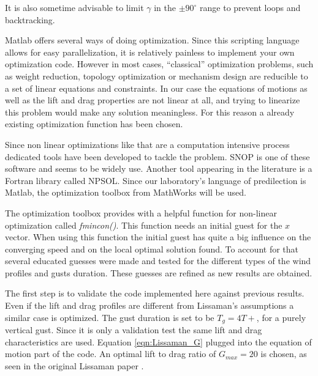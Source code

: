 \par It is also sometime advisable to limit $\gamma$ in the $\pm 90^{\circ}$ range to prevent loops and backtracking.


Matlab offers several ways of doing optimization.
Since this scripting language allows for easy parallelization, it is relatively painless to implement your own optimization code.
However in most cases, ``classical'' optimization problems, such as weight reduction, topology optimization or mechanism design are reducible to a set of linear  equations and constraints.
In our case the equations of motions as well as the lift and drag properties are not linear at all, and trying to linearize this problem would make any solution meaningless.
For this reason a already existing optimization function has been chosen.

\par Since non linear optimizations like that are a computation intensive process dedicated tools have been developed to tackle the problem.
SNOP is one of these software and seems to be widely use.
Another tool appearing in the literature is a Fortran library called NPSOL.
Since our laboratory's language of predilection is Matlab, the optimization toolbox from MathWorks will be used.

\par The optimization toolbox provides with a helpful function for non-linear optimization called \emph{fmincon()}.
This function needs an initial guest for the $x$ vector.
When using this function the initial guest has quite a big influence on the converging speed and on the local optimal solution found.
To account for that several educated guesses were made and tested for the different types of the wind profiles and gusts duration.
These guesses are refined as new results are obtained.


 \label{sec:results}

The first step is to validate the code implemented here against previous results. 
Even if the lift and drag profiles are different from Lissaman's assumptions a similar case is optimized.
The gust duration is set to be $T_g=4 T+$, for a purely vertical gust.
Since it is only a validation test the same lift and drag characteristics are used. Equation \ref{eqn:Lissaman_G} plugged into the equation of motion part of the code. An optimal lift to drag ratio of $G_{max}=20$ is chosen, as seen in the original Lissaman paper \cite{Lissaman2007neutral}.

